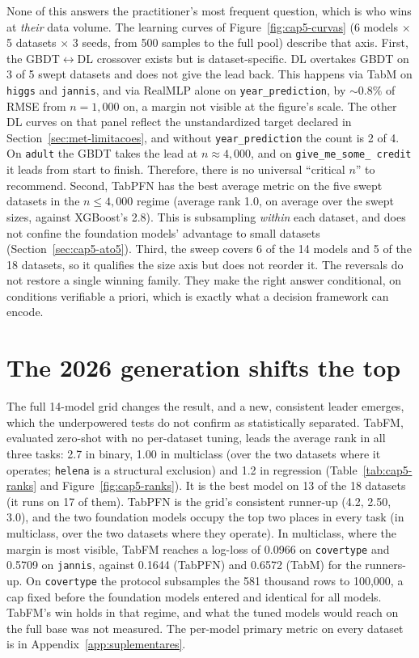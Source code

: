 None of this answers the practitioner's most frequent question, which
is who wins at \emph{their} data volume. The learning curves of
Figure~\ref{fig:cap5-curvas} (6 models
$\times$ 5 datasets $\times$ 3 seeds, from 500 samples to the full
pool) describe that axis. First, the GBDT$\leftrightarrow$DL crossover exists but is
dataset-specific. DL overtakes GBDT on 3 of 5 swept datasets and does
not give the lead back. This happens via TabM on \texttt{higgs} and \texttt{jannis}, and via
RealMLP alone on \texttt{year\_prediction}, by ${\sim}0.8\%$ of RMSE from $n{=}1{,}000$ on, a
margin not visible at the figure's scale. The other DL curves on that
panel reflect the unstandardized target declared in
Section~\ref{sec:met-limitacoes}, and without
\texttt{year\_\allowbreak prediction} the count is 2 of 4. On
\texttt{adult} the GBDT takes the lead at $n \approx 4{,}000$,
and on \texttt{give\_\allowbreak me\_\allowbreak some\_\allowbreak
credit} it leads from start to finish. Therefore, there is no
universal ``critical $n$'' to recommend. Second, TabPFN has the best
average metric on the five swept datasets in the $n \leq 4{,}000$
regime (average rank 1.0, on average over the swept sizes, against
XGBoost's 2.8). This is subsampling \emph{within} each dataset, and
does not confine the foundation models' advantage to small datasets
(Section~\ref{sec:cap5-ato5}). Third, the sweep covers 6 of the 14
models and 5 of the 18 datasets, so it qualifies the size axis but
does not reorder it. The reversals do not restore a single winning family. They make the right answer conditional, on conditions verifiable a priori, which is exactly what a decision framework
can encode.

\section{The 2026 generation shifts the top}
\label{sec:cap5-ato4}
\label{sec:cap5-shift}

The full 14-model grid changes the result, and a new, consistent leader
emerges, which the underpowered tests do not confirm as statistically
separated. TabFM, evaluated zero-shot with no per-dataset tuning,
leads the average rank in all three tasks: 2.7 in binary,
1.00 in multiclass (over the two datasets where it operates;
\texttt{helena} is a structural exclusion) and 1.2 in regression
(Table~\ref{tab:cap5-ranks} and Figure~\ref{fig:cap5-ranks}). It is
the best model on 13 of the 18 datasets (it runs on 17 of them). TabPFN is the grid's consistent
runner-up (4.2, 2.50, 3.0), and the two foundation models occupy the
top two places in every task (in multiclass, over the two datasets
where they operate). In multiclass, where the margin is most visible,
TabFM reaches a log-loss of 0.0966 on \texttt{covertype} and 0.5709 on
\texttt{jannis}, against 0.1644 (TabPFN) and 0.6572 (TabM) for the
runners-up. On \texttt{covertype} the protocol subsamples the 581
thousand rows to 100{,}000, a cap fixed before the foundation
models entered and identical for all models. TabFM's win holds in
that regime, and what the tuned models would reach
on the full base was not measured. The per-model primary metric on every dataset is in
Appendix~\ref{app:suplementares}.

